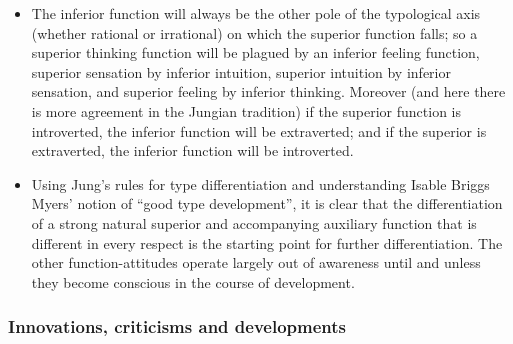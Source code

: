 \begin{itemize}
\item The inferior function will always be the other pole of the typological
axis (whether rational or irrational) on which the superior function falls; so
a superior thinking function will be plagued by an inferior feeling function,
superior sensation by inferior intuition, superior intuition by inferior
sensation, and superior feeling by inferior thinking. Moreover (and here there
is more agreement in the Jungian tradition) if the superior function is
introverted, the inferior function will be extraverted; and if the superior is
extraverted, the inferior function will be introverted.

\item Using Jung's rules for type differentiation and understanding Isable
Briggs Myers' notion of ``good type development'', it is clear that the
differentiation of a strong natural superior and accompanying auxiliary
function that is different in every respect is the starting point for further
differentiation. The other function-attitudes operate largely out of awareness
until and unless they become conscious in the course of development.

\end{itemize}

\subsubsection{Innovations, criticisms and developments}


